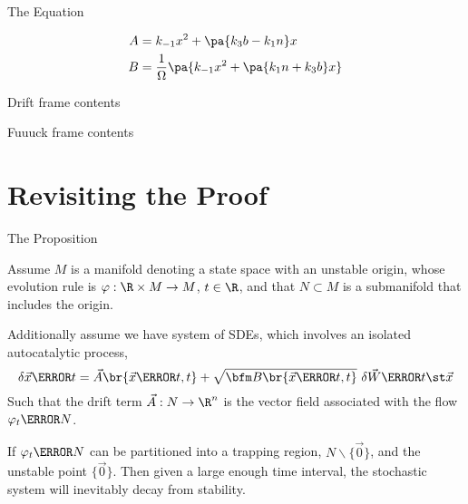 \documentclass[aspectratio=169,  notheorems, sOuRcEs]{RUCPresentation}
\begin{document}
\begin{frame}{The Equation}

    \begin{align}
        A &= k_{-1} x^2 + \pa{ k_3 b - k_1 n } x
        \\
        B &= {1 \over \Omega} \pa{k_{-1} x^2 + \pa{ k_1 n + k_3 b } x}
    \end{align}



\end{frame}

\begin{frame}{Drift}
    frame contents
\end{frame}


\begin{frame}{Fuuuck}
    frame contents
\end{frame}

\section{Revisiting the Proof}
\begin{frame}{The Proposition}

    \begin{proposition}[name={Stochastic Stability Decay}] \label{prp.ssd}

        Assume \(M\) is a manifold denoting a state space with an unstable origin,
        whose {evolution rule} is \(\varphi:\R\times M\to M\),
        \(t\in\R\), and that \(N\subset M\) is a submanifold that includes the origin.

        Additionally assume we have system of SDEs,
        which involves an isolated autocatalytic process,
        \begin{equation*}
            \delta \vec{x}\of t
            = \vec{A}\br{\vec{x}\of t, t}
            + \sqrt{\bfm B\br{\vec{x}\of t, t}} \ \delta{\vec{W}\of{t\st \vec{x}}}
        \end{equation*}
        Such that the drift term \(\vec{A}:N\to\R^n\) is the vector field
        associated with the flow \(\varphi_t\of N\).

        If \(\varphi_t\of{N}\) can be partitioned into a trapping region,
        \(N\backslash\{\vec{0}\}\), and the unstable point \(\{\vec{0}\}\).
        Then given a large enough time interval,
        the stochastic system will inevitably decay from stability.

    \end{proposition}

\end{frame}
\end{document}
